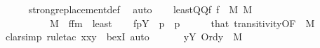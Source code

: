 \begin{isabellebody}
\ \ \ \ \isamarkupfalse%
\ strong{\isacharunderscore}{\kern0pt}replacement{\isacharunderscore}{\kern0pt}def\ \isamarkupfalse%
\ auto\isanewline
\ \ \isamarkupfalse%
\ {\isacartoucheopen}least{\isacharparenleft}{\kern0pt}{\isacharunderscore}{\kern0pt}{\isacharcomma}{\kern0pt}QQ{\isacharparenleft}{\kern0pt}{\isacharunderscore}{\kern0pt}{\isacharparenright}{\kern0pt}{\isacharcomma}{\kern0pt}f{\isacharparenleft}{\kern0pt}{\isacharunderscore}{\kern0pt}{\isacharparenright}{\kern0pt}{\isacharparenright}{\kern0pt}{\isacartoucheclose}\ {\isacartoucheopen}f{\isacharparenleft}{\kern0pt}{\isacharunderscore}{\kern0pt}{\isacharparenright}{\kern0pt}\ {\isasymin}\ M{\isacartoucheclose}\ {\isacartoucheopen}{\isacharquery}{\kern0pt}{\isasympi}{\isasymin}M{\isacartoucheclose}\isanewline
\ \ \ \ {\isacartoucheopen}{\isacharunderscore}{\kern0pt}\ {\isasymLongrightarrow}\ {\isacharunderscore}{\kern0pt}\ {\isasymLongrightarrow}\ {\isacharunderscore}{\kern0pt}\ {\isasymLongrightarrow}\ M{\isacharcomma}{\kern0pt}{\isacharunderscore}{\kern0pt}\ {\isasymTurnstile}\ {\isacharquery}{\kern0pt}f{\isacharunderscore}{\kern0pt}fm\ {\isasymlongleftrightarrow}\ least{\isacharparenleft}{\kern0pt}{\isacharunderscore}{\kern0pt}{\isacharcomma}{\kern0pt}{\isacharunderscore}{\kern0pt}{\isacharcomma}{\kern0pt}{\isacharunderscore}{\kern0pt}{\isacharparenright}{\kern0pt}{\isacartoucheclose}\isanewline
\ \ \isamarkupfalse%
\ {\isachardoublequoteopen}f{\isacharparenleft}{\kern0pt}{\isasymrho}p{\isacharparenright}{\kern0pt}{\isasymin}Y{\isachardoublequoteclose}\ \ {\isachardoublequoteopen}{\isasymrho}p{\isasymin}{\isacharquery}{\kern0pt}{\isasympi}{\isachardoublequoteclose}\ \ {\isasymrho}p\isanewline
\ \ \ \ \isamarkupfalse%
\ that\ transitivity{\isacharbrackleft}{\kern0pt}OF\ {\isacharunderscore}{\kern0pt}\ {\isacartoucheopen}{\isacharquery}{\kern0pt}{\isasympi}{\isasymin}M{\isacartoucheclose}{\isacharbrackright}{\kern0pt}\isanewline
\ \ \ \ \isamarkupfalse%
\ {\isacharparenleft}{\kern0pt}clarsimp{\isacharcomma}{\kern0pt}\ rule{\isacharunderscore}{\kern0pt}tac\ x{\isacharequal}{\kern0pt}{\isachardoublequoteopen}{\isasymlangle}x{\isacharcomma}{\kern0pt}y{\isasymrangle}{\isachardoublequoteclose}\ \ bexI{\isacharcomma}{\kern0pt}\ auto{\isacharparenright}{\kern0pt}\isanewline
\ \ \isamarkupfalse%
\isanewline
\ \ \isamarkupfalse%
\ {\isachardoublequoteopen}{\isacharbraceleft}{\kern0pt}y{\isasymin}Y{\isachardot}{\kern0pt}\ Ord{\isacharparenleft}{\kern0pt}y{\isacharparenright}{\kern0pt}{\isacharbraceright}{\kern0pt}\ {\isasymin}\ M{\isachardoublequoteclose}\isanewline

\end{isabellebody}
